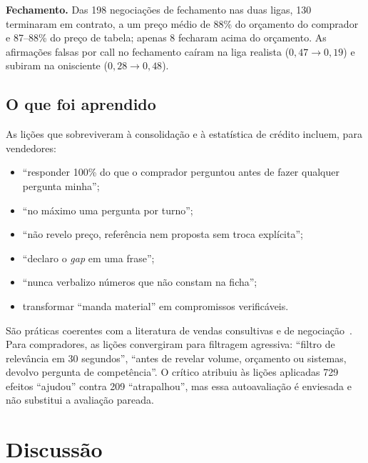 \documentclass[11pt,a4paper]{article}
\begin{document}
\textbf{Fechamento.} Das 198 negociações de fechamento nas duas ligas, 130 terminaram em contrato, a um preço médio de 88\% do orçamento do comprador e 87--88\% do preço de tabela; apenas 8 fecharam acima do orçamento. As afirmações falsas por call no fechamento caíram na liga realista ($0{,}47\to0{,}19$) e subiram na onisciente ($0{,}28\to0{,}48$).

\subsection{O que foi aprendido}

As lições que sobreviveram à consolidação e à estatística de crédito incluem, para vendedores:
\begin{itemize}
  \item ``responder 100\% do que o comprador perguntou antes de fazer qualquer pergunta minha'';
  \item ``no máximo uma pergunta por turno'';
  \item ``não revelo preço, referência nem proposta sem troca explícita'';
  \item ``declaro o \emph{gap} em uma frase'';
  \item ``nunca verbalizo números que não constam na ficha'';
  \item transformar ``manda material'' em compromissos verificáveis.
\end{itemize}
São práticas coerentes com a literatura de vendas consultivas e de negociação~\cite{rackham1988spin,dixon2011challenger,fisher1981getting}. Para compradores, as lições convergiram para filtragem agressiva: ``filtro de relevância em 30 segundos'', ``antes de revelar volume, orçamento ou sistemas, devolvo pergunta de competência''. O crítico atribuiu às lições aplicadas 729 efeitos ``ajudou'' contra 209 ``atrapalhou'', mas essa autoavaliação é enviesada e não substitui a avaliação pareada.

\section{Discussão}
\end{document}
